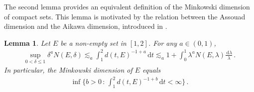 \documentclass[11pt]{amsart}
\theoremstyle{plain}
\newtheorem{lemma}[theorem]{Lemma}
\theoremstyle{definition}
\theoremstyle{remark}
\numberwithin{equation}{section}
\newcommand{\dd}{\,\mathrm{d}}
\begin{document}
The second lemma provides an equivalent definition of the Minkowski dimension of compact sets.
This lemma is motivated by the relation between the Assouad dimension and the Aikawa dimension, introduced in \cite{LeTu20213}.



\begin{lemma}\label{231109742}
    Let $E$ be a non-empty set in $[1,2]$.
    For any $a\in(0,1)$, 
    \begin{align}\label{240313416}
        \sup_{0<\delta\leq 1}\delta^a N(E,\delta)\lesssim_a \int_1^2d(t,E)^{-1+a}\dd t\lesssim_a 1+\int_0^1 \lambda^{a}N(E,\lambda)\frac{\dd \lambda}{\lambda}\,.
    \end{align}
    In particular, the Minkowski dimension of $E$ equals
    \begin{align}\label{240409516}
        \inf\Big\{b>0\,:\,\int_1^2d(t,E)^{-1+b}\dd t<\infty\Big\}\,.
    \end{align}
\end{lemma}
\end{document}
